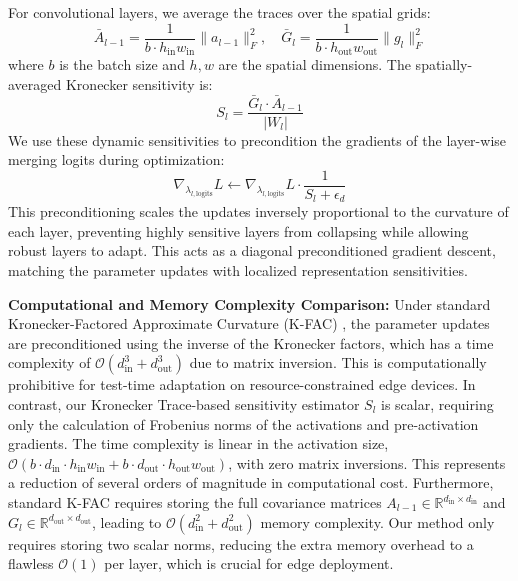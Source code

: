 \documentclass{article}
\theoremstyle{plain}
\theoremstyle{definition}
\theoremstyle{remark}
\begin{document}
For convolutional layers, we average the traces over the spatial grids:
\begin{equation}
\bar{A}_{l-1} = \frac{1}{b \cdot h_{\text{in}} w_{\text{in}}} \|a_{l-1}\|_F^2, \quad \bar{G}_l = \frac{1}{b \cdot h_{\text{out}} w_{\text{out}}} \|g_l\|_F^2
\end{equation}
where $b$ is the batch size and $h, w$ are the spatial dimensions. The spatially-averaged Kronecker sensitivity is:
\begin{equation}
S_l = \frac{\bar{G}_l \cdot \bar{A}_{l-1}}{|W_l|}
\end{equation}
We use these dynamic sensitivities to precondition the gradients of the layer-wise merging logits during optimization:
\begin{equation}
\nabla_{\lambda_{l,\text{logits}}} L \leftarrow \nabla_{\lambda_{l,\text{logits}}} L \cdot \frac{1}{S_l + \epsilon_d}
\end{equation}
This preconditioning scales the updates inversely proportional to the curvature of each layer, preventing highly sensitive layers from collapsing while allowing robust layers to adapt. This acts as a diagonal preconditioned gradient descent, matching the parameter updates with localized representation sensitivities.

\textbf{Computational and Memory Complexity Comparison:} Under standard Kronecker-Factored Approximate Curvature (K-FAC) \cite{martens2015optimizing}, the parameter updates are preconditioned using the inverse of the Kronecker factors, which has a time complexity of $\mathcal{O}(d_{\text{in}}^3 + d_{\text{out}}^3)$ due to matrix inversion. This is computationally prohibitive for test-time adaptation on resource-constrained edge devices. In contrast, our Kronecker Trace-based sensitivity estimator $S_l$ is scalar, requiring only the calculation of Frobenius norms of the activations and pre-activation gradients. The time complexity is linear in the activation size, $\mathcal{O}(b \cdot d_{\text{in}} \cdot h_{\text{in}} w_{\text{in}} + b \cdot d_{\text{out}} \cdot h_{\text{out}} w_{\text{out}})$, with zero matrix inversions. This represents a reduction of several orders of magnitude in computational cost. Furthermore, standard K-FAC requires storing the full covariance matrices $A_{l-1} \in \mathbb{R}^{d_{\text{in}} \times d_{\text{in}}}$ and $G_l \in \mathbb{R}^{d_{\text{out}} \times d_{\text{out}}}$, leading to $\mathcal{O}(d_{\text{in}}^2 + d_{\text{out}}^2)$ memory complexity. Our method only requires storing two scalar norms, reducing the extra memory overhead to a flawless $\mathcal{O}(1)$ per layer, which is crucial for edge deployment.
\end{document}
